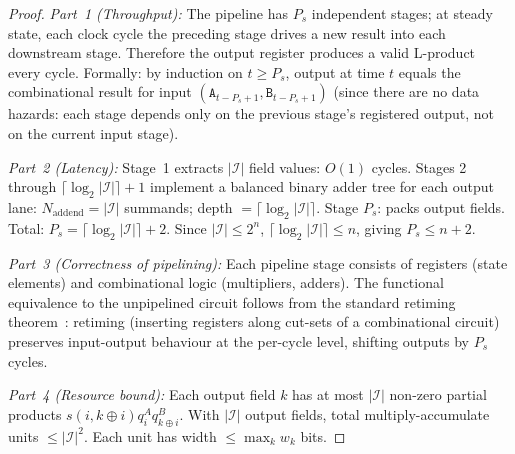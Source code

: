 \documentclass[11pt,a4paper]{article}
\theoremstyle{definition}
\theoremstyle{plain}
\theoremstyle{remark}
\begin{document}
\begin{proof}
\textit{Part~1 (Throughput):}
The pipeline has $P_s$ independent stages; at steady state, each clock
cycle the preceding stage drives a new result into each downstream stage.
Therefore the output register produces a valid L-product every cycle.
Formally: by induction on $t\ge P_s$, output at time $t$ equals the
combinational result for input $(\mathtt{A}_{t-P_s+1}, \mathtt{B}_{t-P_s+1})$
(since there are no data hazards: each stage depends only on the
previous stage's registered output, not on the current input stage).

\textit{Part~2 (Latency):}
Stage~1 extracts $|\mathcal{I}|$ field values: $O(1)$ cycles.
Stages 2 through $\lceil\log_2|\mathcal{I}|\rceil+1$ implement a
balanced binary adder tree for each output lane:
$N_\mathrm{addend}=|\mathcal{I}|$ summands; depth $=\lceil\log_2|\mathcal{I}|\rceil$.
Stage $P_s$: packs output fields.
Total: $P_s=\lceil\log_2|\mathcal{I}|\rceil+2$.
Since $|\mathcal{I}|\le 2^n$, $\lceil\log_2|\mathcal{I}|\rceil\le n$,
giving $P_s\le n+2$.

\textit{Part~3 (Correctness of pipelining):}
Each pipeline stage consists of registers (state elements) and
combinational logic (multipliers, adders).
The functional equivalence to the unpipelined circuit follows from
the standard retiming theorem~\cite{leiserson1991}:
retiming (inserting registers along cut-sets of a combinational circuit)
preserves input-output behaviour at the per-cycle level,
shifting outputs by $P_s$ cycles.

\textit{Part~4 (Resource bound):}
Each output field $k$ has at most $|\mathcal{I}|$ non-zero partial
products $s(i,k\oplus i)q_i^Aq_{k\oplus i}^B$.
With $|\mathcal{I}|$ output fields, total multiply-accumulate units
$\le |\mathcal{I}|^2$.
Each unit has width $\le\max_k w_k$ bits.
\end{proof}
\end{document}

